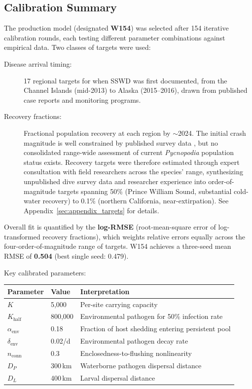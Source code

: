 \subsection{Calibration Summary}
\label{sec:calibration}

The production model (designated \textbf{W154}) was selected after 154
iterative calibration rounds, each testing different parameter combinations
against empirical data.  Two classes of targets were used:

\begin{description}
  \item[Disease arrival timing:] 17 regional targets for when SSWD was first
    documented, from the Channel Islands (mid-2013) to Alaska (2015--2016),
    drawn from published case reports and monitoring programs.
  \item[Recovery fractions:] Fractional population recovery at each region by
    $\sim$2024.  The initial crash magnitude is well constrained by published
    survey data \citep{gravem2021, gehman2025}, but no consolidated range-wide
    assessment of current \textit{Pycnopodia} population status exists.
    Recovery targets were therefore estimated through expert consultation with
    field researchers across the species' range, synthesizing unpublished dive
    survey data and researcher experience into order-of-magnitude targets
    spanning 50\% (Prince William Sound, substantial cold-water recovery) to
    0.1\% (northern California, near-extirpation).  See
    Appendix~\ref{sec:appendix_targets} for details.
\end{description}

Overall fit is quantified by the \textbf{log-RMSE} (root-mean-square error
of log-transformed recovery fractions), which weights relative errors equally
across the four-order-of-magnitude range of targets.  W154 achieves a
three-seed mean RMSE of \textbf{0.504} (best single seed: 0.479).

Key calibrated parameters:
\begin{center}
\small
\begin{tabular}{llp{8cm}}
\toprule
\textbf{Parameter} & \textbf{Value} & \textbf{Interpretation} \\
\midrule
$K$ & 5{,}000 & Per-site carrying capacity \\
$K_\mathrm{half}$ & 800{,}000 & Environmental pathogen for 50\% infection rate \\
$\alpha_\mathrm{env}$ & 0.18 & Fraction of host shedding entering persistent pool \\
$\delta_\mathrm{env}$ & 0.02/d & Environmental pathogen decay rate \\
$n_\mathrm{conn}$ & 0.3 & Enclosedness-to-flushing nonlinearity \\
$D_P$ & 300\,km & Waterborne pathogen dispersal distance \\
$D_L$ & 400\,km & Larval dispersal distance \\
\bottomrule
\end{tabular}
\end{center}

